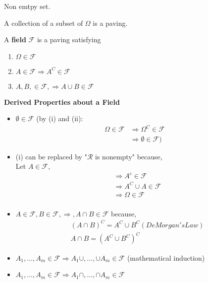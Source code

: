 \documentclass[11pt,fleqn]{book} %
\begin{document}
\begin{definition}[$\Omega$] Non emtpy set. 
	
\end{definition}

\begin{definition}[Paving] A collection of a subset of $\Omega$ is a paving. 
	
\end{definition}

\begin{definition}[Field] A \textbf{field} $\mathscr{F}$ is a paving satisfying
	\begin{enumerate}[label = (\roman*)]
		\item $\Omega \in \mathscr{F}$
		\item $A \in \mathscr{F} \Rightarrow A^C \in \mathscr{F}$
		\item $A, B, \in \mathscr{F}, \Rightarrow A \cup B \in \mathscr{F}$
	\end{enumerate}
	
\end{definition}

\textbf{Derived Properties about a Field }

\begin{itemize}
	\item $\emptyset \in \mathscr{F}$ 
		(by (i) and (ii): 
		\begin{align*}
			\Omega \in \mathscr{F} &\Rightarrow \Omega^C \in \mathscr{F}\\
			&\Rightarrow \emptyset \in \mathscr{F})
		\end{align*}
			
	\item (i) can be replaced by "$\mathscr{R}$ is nonempty" because,\\ 
		Let $A \in \mathscr{F}, $
			\begin{align*}
				&\Rightarrow A^c \in \mathscr{F}\\
			&\Rightarrow A^C \cup A \in \mathscr{F}\\
			&\Rightarrow \Omega \in \mathscr{F}\\
			\end{align*}
			
	\item $A \in \mathscr{F}, B \in \mathscr{F}, \Rightarrow, A\cap B \in \mathscr{F}$ 
	because, \\
		\begin{align*}
		&(A\cap B)^C = A^C \cup B^C (DeMorgan's Law)\\
		&A \cap B = (A^C \cup B^C)^C	
		\end{align*}
		

	\item $A_1, \dots, A_m \in \mathscr{F} \Rightarrow A_1 \cup, \dots, \cup A_m \in \mathscr{F} $ (mathematical induction)
	\item$A_1, \dots, A_m \in \mathscr{F} \Rightarrow A_1 \cap, \dots, \cap A_m \in \mathscr{F} $ 
\end{itemize}
\end{document}
